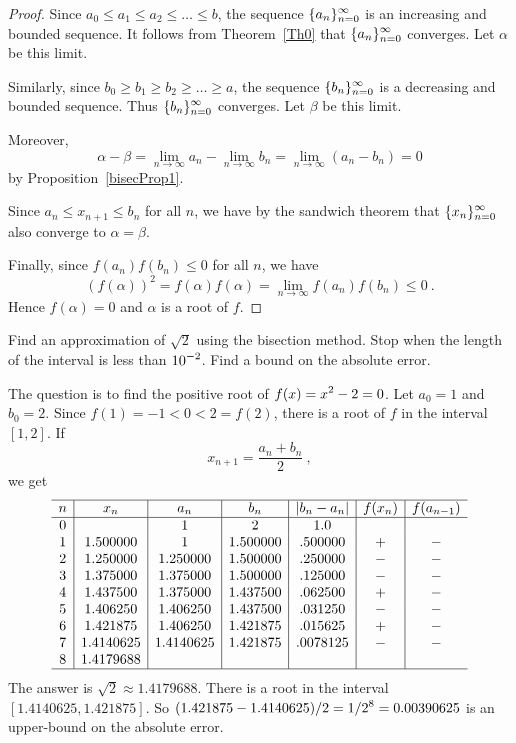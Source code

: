 \begin{proof}
Since $a_0 \leq a_1 \leq a_2 \leq \ldots \leq b$, the sequence
$\displaystyle \{a_n\}_{n=0}^\infty$ is an increasing and bounded sequence.  It
follows from Theorem~\ref{Th0} that $\displaystyle \{a_n\}_{n=0}^\infty$
converges.  Let $\alpha$ be this limit.

Similarly, since $b_0 \geq b_1 \geq b_2 \geq \ldots \geq a$, the sequence
$\displaystyle \{b_n\}_{n=0}^\infty$ is a decreasing and bounded sequence.  Thus
$\displaystyle \{b_n\}_{n=0}^\infty$ converges.  Let $\beta$ be this limit.

Moreover,
\[
\alpha - \beta = \lim_{n\rightarrow \infty} a_n
-\lim_{n\rightarrow \infty} b_n
= \lim_{n\rightarrow \infty} (a_n-b_n) = 0
\]
by Proposition~\ref{bisecProp1}.

Since $a_n \leq x_{n+1} \leq b_n$ for all $n$, we have by the sandwich
theorem that $\displaystyle \{x_n\}_{n=0}^\infty$ also converge to
$\alpha = \beta$.

Finally, since $f(a_n)f(b_n)\leq 0$ for all $n$, we have
\[
\left( f(\alpha) \right)^2 = f(\alpha)f(\alpha)
= \lim_{n\rightarrow \infty} f(a_n)f(b_n) \leq 0 \ .
\]
Hence $f(\alpha) = 0$ and $\alpha$ is a root of $f$.
\end{proof}

\begin{egg}
Find an approximation of $\sqrt{2}$ using the bisection method.  Stop
when the length of the interval is less than $\displaystyle 10^{-2}$.
Find a bound on the absolute error.

The question is to find the positive root of
$\displaystyle f(x) = x^2 -2 = 0$.  Let
$a_0=1$ and $b_0=2$.  Since $f(1) = -1 < 0 < 2 = f(2)$, there is a
root of $f$ in the interval $[1,2]$.  If
\[
x_{n+1}=\frac{a_n+b_n}{2} \ ,
\]
we get
\[
\begin{array}{c|c|c|c|c|c|c}
\hline
 n & x_n & a_n & b_n & |b_n-a_n|  & f(x_n)  &  f(a_{n-1})  \\
\hline
0&  &1 &2 & 1.0 & & \\
1& 1.500000 & 1 & 1.500000 & .500000 & + & - \\
2& 1.250000 & 1.250000 & 1.500000 & .250000 & - & - \\
3& 1.375000 & 1.375000 & 1.500000 & .125000 & - & - \\
4& 1.437500 & 1.375000 & 1.437500 & .062500 & + & - \\
5& 1.406250 & 1.406250 & 1.437500 & .031250 & - & - \\
6& 1.421875 & 1.406250 & 1.421875 & .015625 & + & - \\
7& 1.4140625 & 1.4140625 & 1.421875 & .0078125 & - & - \\
8& 1.4179688 & & & & & \\
\hline
\end{array}
\]
The answer is $\sqrt{2} \approx 1.4179688$.  There is a root in the
interval $[1.4140625,1.421875]$.  So
$\displaystyle (1.421875 - 1.4140625)/2 = 1/2^8 = 0.00390625$ is an
upper-bound on the absolute error.
\label{ExSqrt2}
\end{egg}

